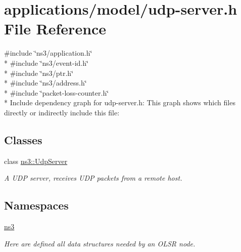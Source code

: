 \hypertarget{udp-server_8h}{}\section{applications/model/udp-\/server.h File Reference}
\label{udp-server_8h}
{\ttfamily \#include \char`\"{}ns3/application.\+h\char`\"{}}\\*
{\ttfamily \#include \char`\"{}ns3/event-\/id.\+h\char`\"{}}\\*
{\ttfamily \#include \char`\"{}ns3/ptr.\+h\char`\"{}}\\*
{\ttfamily \#include \char`\"{}ns3/address.\+h\char`\"{}}\\*
{\ttfamily \#include \char`\"{}packet-\/loss-\/counter.\+h\char`\"{}}\\*
Include dependency graph for udp-\/server.h\+:
This graph shows which files directly or indirectly include this file\+:
\subsection*{Classes}
\begin{DoxyCompactItemize}
\item 
class \hyperlink{classns3_1_1UdpServer}{ns3\+::\+Udp\+Server}
\begin{DoxyCompactList}\small\item\em A U\+DP server, receives U\+DP packets from a remote host. \end{DoxyCompactList}\end{DoxyCompactItemize}
\subsection*{Namespaces}
\begin{DoxyCompactItemize}
\item 
 \hyperlink{namespacens3}{ns3}
\begin{DoxyCompactList}\small\item\em Here are defined all data structures needed by an O\+L\+SR node. \end{DoxyCompactList}\end{DoxyCompactItemize}
